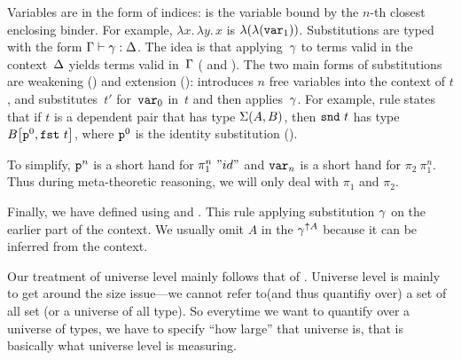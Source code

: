 Variables are in the form of \citeauthor{debruijn1964} indices:
 is the variable bound by the $n$-th closest enclosing binder.
For example, $\lambda x.\,\lambda y.\,x$ is $\lambda({\lambda({\texttt{var}_{1}})})$.
%
Substitutions are typed with the form 
$ {\Gamma} \vdash {\ensuremath{\gamma}} : {\Delta} $.
The idea is that applying~$\gamma$ to terms valid in the context~$\Delta$
yields terms valid in~$\Gamma$ ( and ).
%
The two main forms of substitutions are weakening () and extension ():
 introduces $n$ free variables into the context of $t$, and
 substitutes~$t'$ for~$\texttt{var}_{0}$ in~$t$ and
then applies~$\gamma$.
For example, rule  states that if $t$ is a dependent pair
that has type $\Sigma({A},{B})$, then $\texttt{snd}~{t}$ has type
${B}\!\left[{{\texttt{p}^{0}},{\texttt{fst}~{t}}}\right]$,
where $\texttt{p}^{0}$ is the identity substitution ().

To simplify, $\texttt{p}^{n}$ is a short hand for $\pi_1^n~"id"$ and $\texttt{var}_{n}$ is a short hand for $\pi_2~\pi_1^{n}$. Thus during meta-theoretic reasoning, we will only deal with $\pi_1$ and $\pi_2$.

Finally, we have  defined using  and . This rule applying substitution $\gamma$ on the earlier part of the context. We usually omit $A$ in the $\gamma^{\uparrow A}$ because it can be inferred from the context.

 Our treatment of universe level mainly follows that of \citet{altkap2016, kaposi2019gluing}. Universe level is mainly to get around the size issue---we cannot refer to(and thus quantifiy over) a set of all set (or a universe of all type). So everytime we want to quantify over a universe of types, we have to specify ``how large'' that universe is, that is basically what universe level is measuring. 





